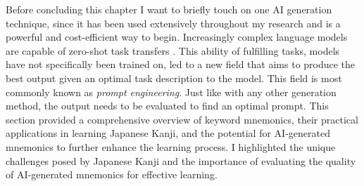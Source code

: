 Before concluding this chapter I want to briefly touch on one AI generation technique, since it has been used extensively throughout my research and is a powerful and cost-efficient way to begin. Increasingly complex language models are capable of zero-shot task transfers \cite{radford2019language}. This ability of fulfilling tasks, models have not specifically been trained on, led to a new field that aims to produce the best output given an optimal task description to the model. This field is most commonly known as \emph{prompt engineering}. Just like with any other generation method, the output needs to be evaluated to find an optimal prompt.
\newline
\newline
 This section provided a comprehensive overview of keyword mnemonics, their practical applications in learning Japanese Kanji, and the potential for AI-generated mnemonics to further enhance the learning process. I highlighted the unique challenges posed by Japanese Kanji and the importance of evaluating the quality of AI-generated mnemonics for effective learning.